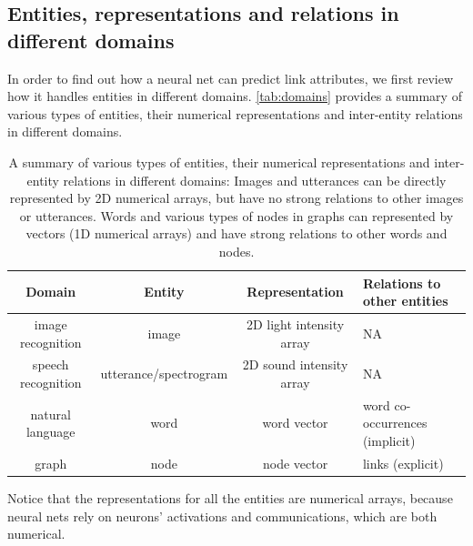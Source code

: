 \documentclass{article}
\begin{document}
\subsection{Entities, representations and relations in different domains}
In order to find out how a neural net can predict link attributes, we first 
review how it handles entities in different domains.
\autoref{tab:domains} provides a summary of various types of entities, their 
numerical representations and inter-entity relations in different domains.
\begin{table}[h]
	\centering
	\caption{A summary of various types of entities, their numerical
		representations and inter-entity relations in different domains:
		Images and utterances can be directly represented by 2D numerical 
		arrays, but have no strong relations to other images or utterances. 
		Words and various types of nodes in graphs can represented by vectors 
		(1D numerical arrays) and have strong relations to other words and 
		nodes.}
	\begin{tabularx}{\textwidth}{ |c|c|c|X| } \hline
		\textbf{Domain} & \textbf{Entity} & \textbf{Representation} & 
		\textbf{Relations to other entities} \\ \hline
		image recognition & image & 2D light intensity array & NA \\ \hline
		speech recognition & utterance/spectrogram & 2D sound intensity array & 
		NA \\ \hline
		natural language & word & word vector & word co-occurrences (implicit) 
		\\ \hline
		graph & node & node vector & links (explicit) \\ \hline
	\end{tabularx}
	\label{tab:domains}
\end{table}
Notice that the representations for all the entities are numerical arrays, 
because neural nets rely on neurons' activations and communications, which 
are both numerical.
\end{document}
